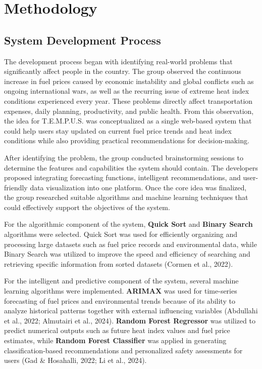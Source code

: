 \documentclass[12pt]{article}
\begin{document}
\section{Methodology}

\subsection{System Development Process}

The development process began with identifying real-world problems that significantly affect people in the country. The group observed the continuous increase in fuel prices caused by economic instability and global conflicts such as ongoing international wars, as well as the recurring issue of extreme heat index conditions experienced every year. These problems directly affect transportation expenses, daily planning, productivity, and public health. From this observation, the idea for T.E.M.P.U.S. was conceptualized as a single web-based system that could help users stay updated on current fuel price trends and heat index conditions while also providing practical recommendations for decision-making.

After identifying the problem, the group conducted brainstorming sessions to determine the features and capabilities the system should contain. The developers proposed integrating forecasting functions, intelligent recommendations, and user-friendly data visualization into one platform. Once the core idea was finalized, the group researched suitable algorithms and machine learning techniques that could effectively support the objectives of the system.

For the algorithmic component of the system, \textbf{Quick Sort} and \textbf{Binary Search} algorithms were selected. Quick Sort was used for efficiently organizing and processing large datasets such as fuel price records and environmental data, while Binary Search was utilized to improve the speed and efficiency of searching and retrieving specific information from sorted datasets (Cormen et al., 2022).

For the intelligent and predictive component of the system, several machine learning algorithms were implemented. \textbf{ARIMAX} was used for time-series forecasting of fuel prices and environmental trends because of its ability to analyze historical patterns together with external influencing variables (Abdullahi et al., 2022; Almutairi et al., 2024). \textbf{Random Forest Regressor} was utilized to predict numerical outputs such as future heat index values and fuel price estimates, while \textbf{Random Forest Classifier} was applied in generating classification-based recommendations and personalized safety assessments for users (Gad \& Hosahalli, 2022; Li et al., 2024).
\end{document}
